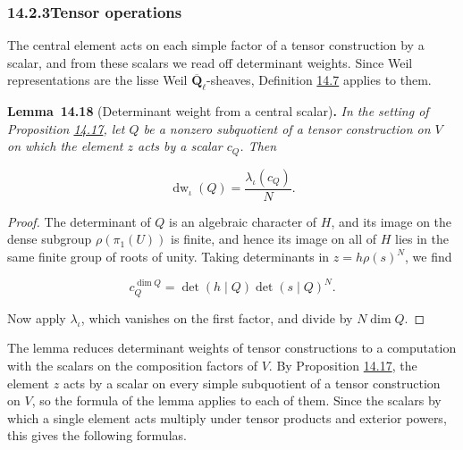 \documentclass[11pt]{article}
\newenvironment{bpstatement}[2]{\par\addvspace{0.6\baselineskip}\noindent\textbf{#1}#2\textbf{.}\enspace\ignorespaces}
  {\par\addvspace{0.4\baselineskip}}
\newenvironment{bpstatementit}[2]{\begin{bpstatement}{#1}{#2}\itshape\ignorespaces}{\end{bpstatement}}
\begin{document}
\subsubsection*{\texorpdfstring{14.2.3\quad Tensor operations}{14.2.3 Tensor operations}}
\label{bp56}%
\label{bp57}%
The central element acts on each simple factor of a tensor construction by a scalar, and from these scalars we read off determinant weights. Since Weil representations are the lisse Weil \(\overline{\mathbf Q}_\ell\)-sheaves, Definition \hyperref[bp26]{14.7} applies to them.

\label{bp58}%
\begin{bpstatementit}{Lemma~14.18}{ (Determinant weight from a central scalar)}
In the setting of Proposition \hyperref[bp54]{14.17}, let \(Q\) be a nonzero subquotient of a tensor construction on \(V\) on which the element \(z\) acts by a scalar \(c_Q\). Then

\[
\operatorname{dw}_\iota(Q)=\frac{\lambda_\iota(c_Q)}{N}.
\]
\end{bpstatementit}

\begin{proof}[{Proof}]\label{bp59}%
The determinant of \(Q\) is an algebraic character of \(H\), and its image on the dense subgroup \(\rho(\pi_1(U))\) is finite, and hence its image on all of \(H\) lies in the same finite group of roots of unity. Taking determinants in \(z=h\rho(s)^N\), we find

\[
c_Q^{\dim Q}=\det(h\mid Q)\det(s\mid Q)^N.
\]

Now apply \(\lambda_\iota\), which vanishes on the first factor, and divide by \(N\dim Q\).
\end{proof}

\label{bp60}%
The lemma reduces determinant weights of tensor constructions to a computation with the scalars on the composition factors of \(V\). By Proposition \hyperref[bp54]{14.17}, the element \(z\) acts by a scalar on every simple subquotient of a tensor construction on \(V\), so the formula of the lemma applies to each of them. Since the scalars by which a single element acts multiply under tensor products and exterior powers, this gives the following formulas.
\end{document}
